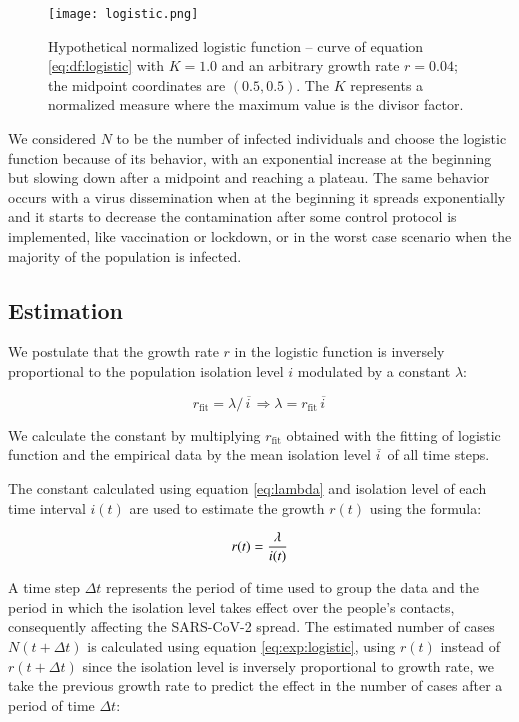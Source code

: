 \documentclass[review]{elsarticle}
\begin{document}
\begin{figure}
\texttt{[image: logistic.png]}
\caption{Hypothetical normalized logistic function -- 
curve of equation \ref{eq:df:logistic} with 
$K=1.0$ and an arbitrary growth rate $r=0.04$; 
the midpoint coordinates are $(0.5, 0.5)$.
The $K$ represents a normalized measure where 
the maximum value is the divisor factor.}
\label{fig:logistic}
\end{figure}

We considered $N$ to be the number of infected individuals 
and choose the logistic function because of its behavior, 
with an exponential increase at the beginning but slowing down after 
a  midpoint and reaching a plateau. 
The same behavior occurs with a virus dissemination when at the 
beginning it spreads exponentially and it starts to 
decrease the contamination after some control protocol is implemented, 
like vaccination or lockdown, 
or in the worst case scenario when the majority of the population is infected.

\subsection{Estimation}

We postulate that the growth rate $r$ in the logistic function is 
inversely proportional to the population isolation level $i$ 
modulated by a constant $\lambda$:

\begin{equation}
r_{\text{fit}} = {\lambda /\, \overline{i\,}} \Rightarrow \lambda = r_{\text{fit}}\, \overline{i\,}
\label{eq:lambda}
\end{equation}

We calculate the constant by multiplying $r_{\text{fit}}$ 
obtained with the fitting of 
logistic function and the empirical data by 
the mean isolation level $\overline{i\,}$  
of all time steps.

The constant calculated using equation \ref{eq:lambda} 
and isolation level of each time interval $i(t)$ 
are used to estimate the growth $r(t)$ using the formula:

\begin{equation}
r(t) = {\lambda\over i(t)}
\label{eq:rt}
\end{equation}

A time step $\Delta t$ represents the period of time used to group the data 
and the period in which the isolation level takes effect over
 the people's contacts, consequently affecting the SARS-CoV-2 spread. 
The estimated number of cases $N(t+\Delta t)$ is calculated using
 equation \ref{eq:exp:logistic}, using $r(t)$ instead of $r(t+\Delta t)$ since 
the isolation level is inversely proportional to growth rate, we take
 the previous growth rate to predict the effect in the number of cases after a 
period of time $\Delta t$:
\end{document}
